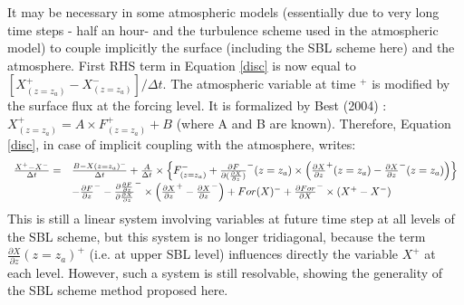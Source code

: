 It may be necessary in some atmospheric models (essentially due to very long time steps - half an hour- and the turbulence scheme used in the atmospheric model) to couple implicitly the surface (including the SBL scheme here) and the atmosphere. First RHS term in Equation \ref{disc} is now equal to $[X_{(z=z_a)}^+ -X_{(z=z_a)}^-]/\Delta t$. The atmospheric variable at time $^+$ is modified by the surface flux at the forcing level. It is formalized by Best \etal (2004)\nocite{Best2004} : $X_{(z=z_a)}^+ = A \times F_{(z=z_a)}^+ + B$ (where A and B are known). Therefore,  Equation \ref{disc}, in case of implicit coupling with the atmosphere, writes:
\begin{equation}
\begin{array}{ll}
\frac{X^+ - X^-}{\Delta t} =& \frac{B-X{(z=z_a)}^-}{\Delta t} + \frac{A}{\Delta t}\times \left\{ F^-_{(z=z_a)}+ \frac{\partial F}{\partial (\frac{\partial X}{\partial z})}^-{\scriptsize{(z=z_a)}}\times \left(\frac{\partial X}{\partial z}^+{\scriptsize{(z=z_a)}}-\frac{\partial X}{\partial z}^-{\scriptsize{(z=z_a)}}\right)\right\}  \\
&- \frac{\partial F}{\partial z}^- - \frac{\partial \frac{\partial F}{\partial z}}{\partial \frac{\partial X}{\partial z}}^- \times \left(\frac{\partial X}{\partial z}^+-\frac{\partial X}{\partial z}^-\right) + For(X)^- + \frac{\partial For}{\partial X}^- \times(X^+-X^-)
\end{array}
\end{equation}
This is still a linear system involving variables at future time step at all levels of the SBL scheme, but this system is no longer tridiagonal, because the term $\frac{\partial X}{\partial z}(z=z_a)^+$ (i.e. at upper SBL level) influences directly the variable $X^+$ at each level. However, such a system is still resolvable, showing the generality of the SBL scheme method proposed here.


